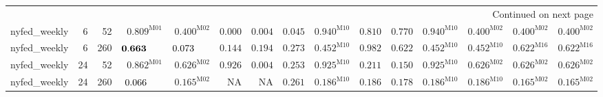 \documentclass[10pt,a4paper]{article}
\begin{document}
\begin{longtable}{@{}lrrrrrrrrrrrrrr@{}}
\midrule
\endhead
\midrule\multicolumn{15}{r}{Continued on next page}\\\endfoot
\bottomrule\endlastfoot
nyfed\_weekly & 6 & 52 & $\mathbf{0.809}^{\mathrm{M01}}$ & $\mathbf{0.400}^{\mathrm{M02}}$ & $0.000$ & $0.004$ & $0.045$ & $\mathbf{0.940}^{\mathrm{M10}}$ & $\mathbf{0.810}$ & $\mathbf{0.770}$ & $\mathbf{0.940}^{\mathrm{M10}}$ & $\mathbf{0.400}^{\mathrm{M02}}$ & $\mathbf{0.400}^{\mathrm{M02}}$ & $\mathbf{0.400}^{\mathrm{M02}}$ \\
nyfed\_weekly & 6 & 260 & $\mathbf{0.663}\hphantom{^{\mathrm{M00}}}$ & $0.073\hphantom{^{\mathrm{M00}}}$ & $\mathbf{0.144}$ & $\mathbf{0.194}$ & $\mathbf{0.273}$ & $\mathbf{0.452}^{\mathrm{M10}}$ & $\mathbf{0.982}$ & $\mathbf{0.622}$ & $\mathbf{0.452}^{\mathrm{M10}}$ & $\mathbf{0.452}^{\mathrm{M10}}$ & $\mathbf{0.622}^{\mathrm{M16}}$ & $\mathbf{0.622}^{\mathrm{M16}}$ \\
nyfed\_weekly & 24 & 52 & $\mathbf{0.862}^{\mathrm{M01}}$ & $\mathbf{0.626}^{\mathrm{M02}}$ & $\mathbf{0.926}$ & $0.004$ & $\mathbf{0.253}$ & $\mathbf{0.925}^{\mathrm{M10}}$ & $\mathbf{0.211}$ & $\mathbf{0.150}$ & $\mathbf{0.925}^{\mathrm{M10}}$ & $\mathbf{0.626}^{\mathrm{M02}}$ & $\mathbf{0.626}^{\mathrm{M02}}$ & $\mathbf{0.626}^{\mathrm{M02}}$ \\
nyfed\_weekly & 24 & 260 & $0.066\hphantom{^{\mathrm{M00}}}$ & $\mathbf{0.165}^{\mathrm{M02}}$ & \textsc{NA} & \textsc{NA} & $\mathbf{0.261}$ & $\mathbf{0.186}^{\mathrm{M10}}$ & $\mathbf{0.186}$ & $\mathbf{0.178}$ & $\mathbf{0.186}^{\mathrm{M10}}$ & $\mathbf{0.186}^{\mathrm{M10}}$ & $\mathbf{0.165}^{\mathrm{M02}}$ & $\mathbf{0.165}^{\mathrm{M02}}$ \\
\end{longtable}
\end{document}
